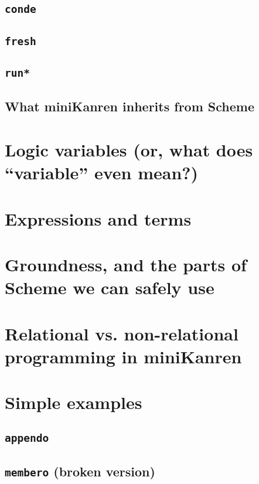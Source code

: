 \documentclass{book}
\begin{document}
\subsection{\texttt{conde}}

\subsection{\texttt{fresh}}

\subsection{\texttt{run*}}

\subsection{What miniKanren inherits from Scheme}

\section{Logic variables (or, what does ``variable'' even mean?)}

\section{Expressions and terms}

\section{Groundness, and the parts of Scheme we can safely use}

\section{Relational vs. non-relational programming in miniKanren}

\section{Simple examples}

\subsection{\texttt{appendo}}

\subsection{\texttt{membero} (broken version)}
\end{document}
